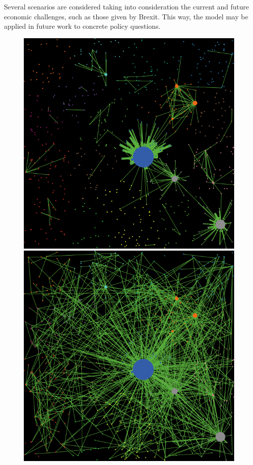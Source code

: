 \documentclass[10pt,letterpaper]{article}
\begin{document}
Several scenarios are considered taking into consideration the current and future economic challenges, such as those given by Brexit. This way, the model may be applied in future work to concrete policy questions.


\begin{figure}
\vspace{-2cm}
\begin{center}
    \begin{minipage}[c]{0.25\textwidth}
        \includegraphics[width=\textwidth]{figures/ex_alleq-lowgravity_seed-12102_t1500.png}\\
        \includegraphics[width=\textwidth]{figures/ex_alleq-highgravity_seed-12102_t1500.png}

\end{minipage}
\end{center}
\end{figure}
\end{document}
